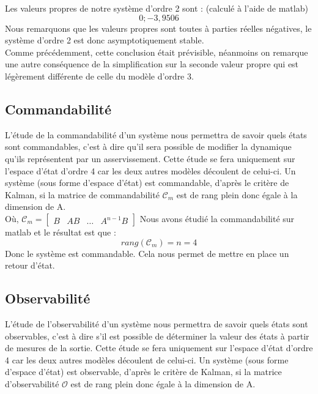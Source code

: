 \noindent Les valeurs propres de notre système d'ordre 2 sont : (calculé à l'aide de matlab)\\
\begin{equation}
{0 ; -3,9506 }
\end{equation}
Nous remarquons que les valeurs propres sont toutes à parties réelles négatives, le système d'ordre 2 est donc asymptotiquement stable.\\
Comme précédemment, cette conclusion était prévisible, néanmoins on remarque une autre conséquence de la simplification sur la seconde valeur propre qui est légèrement différente de celle du modèle d'ordre 3.

\subsection{Commandabilité}
L'étude de la commandabilité d'un système nous permettra de savoir quels états sont commandables, c'est à dire qu'il sera possible de modifier la dynamique qu'ils représentent par un asservissement. Cette étude se fera uniquement sur l'espace d'état d'ordre 4 car les deux autres modèles découlent de celui-ci. Un système (sous forme d'espace d'état) est commandable, d'après le critère de Kalman, si 
la matrice de commandabilité $\mathcal{C}_m$ est de rang plein donc égale à la dimension de A.\\

Où, $ \mathcal{C}_m = \begin{bmatrix} B  & AB & \dots & A^{n−1}B\end{bmatrix}$
Nous avons étudié la commandabilité sur matlab et le résultat est que :
$$rang(\mathcal{C}_m) = n = 4 $$
Donc le système est commandable. Cela nous permet de mettre en place un retour d'état. 

\subsection{Observabilité}
L'étude de l'observabilité d'un système nous permettra de savoir quels états sont observables, c'est à dire s'il est possible de déterminer la valeur des états à partir de mesures de la sortie. Cette étude se fera uniquement sur l'espace d'état d'ordre 4 car les deux autres modèles découlent de celui-ci. Un système (sous forme d'espace d'état) est observable, d'après le critère de Kalman, si 
la matrice d'observabilité  $\mathcal{O}$ est de rang plein donc égale à la dimension de A.\\

